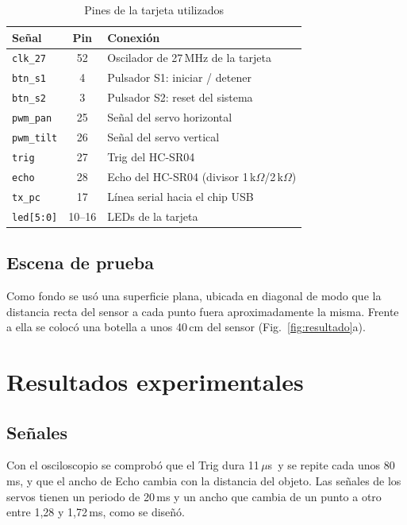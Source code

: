 \documentclass[conference]{IEEEtran}
\newcommand{\mo}[1]{\texttt{#1}}
\newcommand{\us}{\,$\mu$s}
\begin{document}
\begin{table}[t]
\centering
\caption{Pines de la tarjeta utilizados}
\label{tab:pines}
\begin{tabular}{@{}l c l@{}}
\toprule
Señal & Pin & Conexión \\
\midrule
\mo{clk\_27}   & 52 & Oscilador de 27\,MHz de la tarjeta \\
\mo{btn\_s1}   & 4  & Pulsador S1: iniciar / detener \\
\mo{btn\_s2}   & 3  & Pulsador S2: reset del sistema \\
\mo{pwm\_pan}  & 25 & Señal del servo horizontal \\
\mo{pwm\_tilt} & 26 & Señal del servo vertical \\
\mo{trig}      & 27 & Trig del HC-SR04 \\
\mo{echo}      & 28 & Echo del HC-SR04 (divisor 1\,k$\Omega$/2\,k$\Omega$) \\
\mo{tx\_pc}    & 17 & Línea serial hacia el chip USB \\
\mo{led[5:0]}  & 10--16 & LEDs de la tarjeta \\
\bottomrule
\end{tabular}
\end{table}

\subsection{Escena de prueba}
Como fondo se usó una superficie plana, ubicada en diagonal de modo que la distancia recta del sensor a cada punto fuera aproximadamente la misma. Frente a ella se colocó una botella a unos 40\,cm del sensor (Fig.~\ref{fig:resultado}a).

\section{Resultados experimentales}



\subsection{Señales}
Con el osciloscopio se comprobó que el Trig dura 11\us\ y se repite cada unos 80\,ms, y que el ancho de Echo cambia con la distancia del objeto. Las señales de los servos tienen un periodo de 20\,ms y un ancho que cambia de un punto a otro entre 1,28 y 1,72\,ms, como se diseñó.
\end{document}
